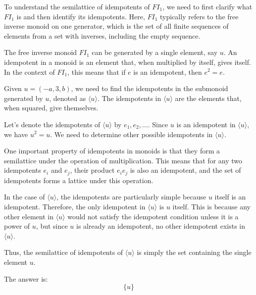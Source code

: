 To understand the semilattice of idempotents of \( FI_1 \), we need to first clarify what \( FI_1 \) is and then identify its idempotents. Here, \( FI_1 \) typically refers to the free inverse monoid on one generator, which is the set of all finite sequences of elements from a set with inverses, including the empty sequence.

The free inverse monoid \( FI_1 \) can be generated by a single element, say \( u \). An idempotent in a monoid is an element that, when multiplied by itself, gives itself. In the context of \( FI_1 \), this means that if \( e \) is an idempotent, then \( e^2 = e \).

Given \( u = (-a, 3, b) \), we need to find the idempotents in the submonoid generated by \( u \), denoted as \( \langle u \rangle \). The idempotents in \( \langle u \rangle \) are the elements that, when squared, give themselves.

Let's denote the idempotents of \( \langle u \rangle \) by \( e_1, e_2, \ldots \). Since \( u \) is an idempotent in \( \langle u \rangle \), we have \( u^2 = u \). We need to determine other possible idempotents in \( \langle u \rangle \).

One important property of idempotents in monoids is that they form a semilattice under the operation of multiplication. This means that for any two idempotents \( e_i \) and \( e_j \), their product \( e_i e_j \) is also an idempotent, and the set of idempotents forms a lattice under this operation.

In the case of \( \langle u \rangle \), the idempotents are particularly simple because \( u \) itself is an idempotent. Therefore, the only idempotent in \( \langle u \rangle \) is \( u \) itself. This is because any other element in \( \langle u \rangle \) would not satisfy the idempotent condition unless it is a power of \( u \), but since \( u \) is already an idempotent, no other idempotent exists in \( \langle u \rangle \).

Thus, the semilattice of idempotents of \( \langle u \rangle \) is simply the set containing the single element \( u \).

The answer is:
\[
\boxed{\{u\}}
\]